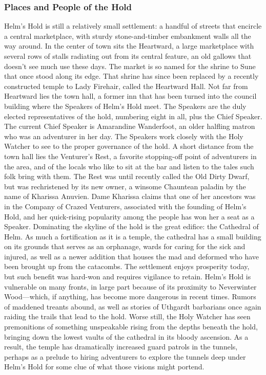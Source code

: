 \documentclass[10pt,a4paper,twoside,twocolumn,openany,bg=print,nodeprecatedcode]{dndbook}
\begin{document}
\subsubsection{Places and People of the Hold}
Helm's Hold is still a relatively small settlement: a handful of streets that encircle a central marketplace, with sturdy stone-and-timber embankment walls all the way around. In the center of town sits the Heartward, a large marketplace with several rows of stalls radiating out from its central feature, an old gallows that doesn't see much use these days. The market is so named for the shrine to Sune that once stood along its edge. That shrine has since been replaced by a recently constructed temple to Lady Firehair, called the Heartward Hall.
Not far from Heartward lies the town hall, a former inn that has been turned into the council building where the Speakers of Helm's Hold meet. The Speakers are the duly elected representatives of the hold, numbering eight in all, plus the Chief Speaker. The current Chief Speaker is Amarandine Wanderfoot, an older halfling matron who was an adventurer in her day. The Speakers work closely with the Holy Watcher to see to the proper governance of the hold.
A short distance from the town hall lies the Venturer's Rest, a favorite stopping-off point of adventurers in the area, and of the locals who like to sit at the bar and listen to the tales such folk bring with them. The Rest was until recently called the Old Dirty Dwarf, but was rechristened by its new owner, a winsome Chauntean paladin by the name of Kharissa Anuvien. Dame Kharissa claims that one of her ancestors was in the Company of Crazed Venturers, associated with the founding of Helm's Hold, and her quick-rising popularity among the people has won her a seat as a Speaker.
Dominating the skyline of the hold is the great edifice: the Cathedral of Helm. As much a fortification as it is a temple, the cathedral has a small building on its grounds that serves as an orphanage, wards for caring for the sick and injured, as well as a newer addition that houses the mad and deformed who have been brought up from the catacombs.
The settlement enjoys prosperity today, but such benefit was hard-won and requires vigilance to retain. Helm's Hold is vulnerable on many fronts, in large part because of its proximity to Neverwinter Wood—which, if anything, has become more dangerous in recent times. Rumors of maddened treants abound, as well as stories of Uthgardt barbarians once again raiding the trails that lead to the hold.
Worse still, the Holy Watcher has seen premonitions of something unspeakable rising from the depths beneath the hold, bringing down the lowest vaults of the cathedral in its bloody ascension. As a result, the temple has dramatically increased guard patrols in the tunnels, perhaps as a prelude to hiring adventurers to explore the tunnels deep under Helm's Hold for some clue of what those visions might portend.
\end{document}
